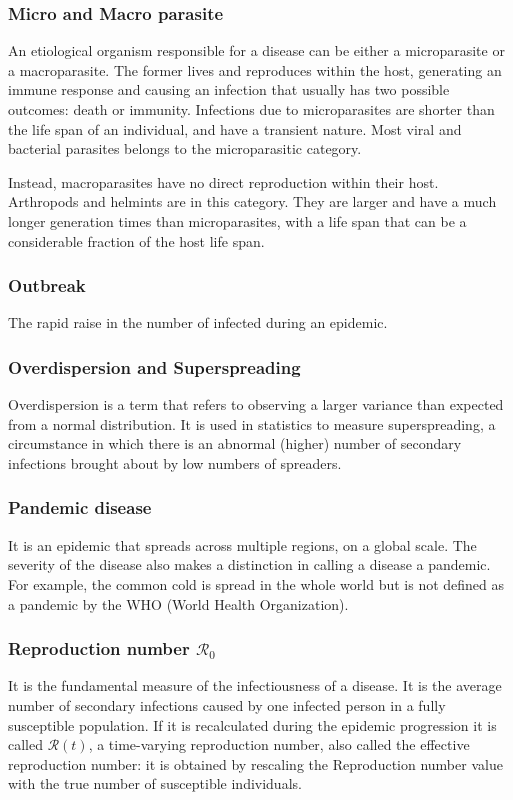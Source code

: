 \subsubsection{Micro and Macro parasite}
An etiological organism responsible for a disease can be either a  microparasite or a macroparasite. The former lives and reproduces within the host, generating an immune response and causing an infection that usually has two possible outcomes: death or immunity. Infections due to microparasites are shorter than the life span of an individual, and have a transient nature. Most viral and bacterial parasites belongs to the microparasitic category.

Instead, macroparasites have no direct reproduction within their host. Arthropods and helmints are in this category. They are larger and have a much longer generation times than microparasites, with a life span that can be a considerable fraction of the host life span.


\subsubsection{Outbreak} The rapid raise in the number of infected during an epidemic.


\subsubsection{Overdispersion and Superspreading} Overdispersion is a term that refers to observing a larger variance than expected from a normal distribution. It is used in statistics to measure superspreading, a circumstance in which there is an abnormal (higher) number of secondary infections brought about by low numbers of spreaders.

\subsubsection{Pandemic disease} It is an epidemic that spreads across multiple regions, on a global scale. The severity of the disease also makes a distinction in calling a disease a pandemic. For example, the common cold is spread in the whole world but is not defined as a pandemic by the WHO (World Health Organization). 

\subsubsection{Reproduction number $\mathcal{R}_0$} It is the fundamental measure of the infectiousness of a disease. It is the average number of secondary infections caused by one infected person in a fully susceptible population. If it is recalculated during the epidemic progression it is called $\mathcal{R}(t)$, a time-varying reproduction number, also called the effective reproduction number: it is obtained by rescaling the Reproduction number value with the true number of susceptible individuals.

